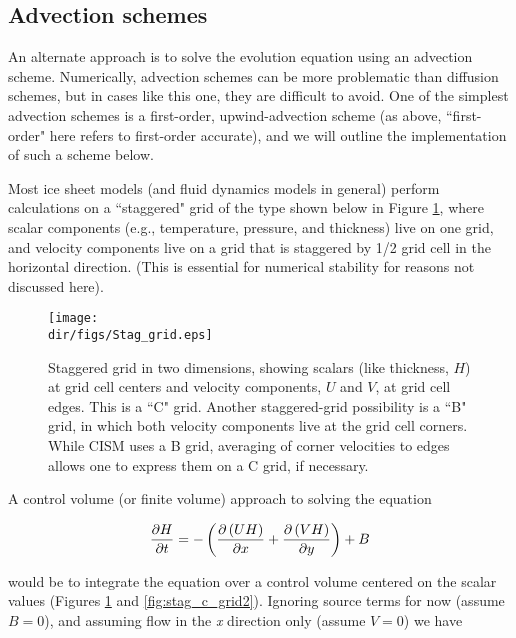 \subsection{Advection schemes}
An alternate approach is to solve the evolution equation using an advection scheme. Numerically, advection schemes can be more problematic than diffusion schemes, but in cases like this one, they are difficult to avoid. One of the simplest advection schemes is a first-order, upwind-advection scheme (as above, ``first-order" here refers to first-order accurate), and we will outline the implementation of such a scheme below.

Most ice sheet models (and fluid dynamics models in general) perform calculations on a ``staggered" grid of the type shown below in Figure \ref{fig:stag_c_grid}, where scalar components (e.g., temperature, pressure, and thickness) live on one grid, and velocity components live on 
a grid that is staggered by 1/2 grid cell in the horizontal direction. (This is essential for numerical stability for reasons not discussed here).

\begin{figure}
  \begin{center}
    \texttt{[image: \\dir/figs/Stag\_grid.eps]}
  \end{center}
\caption{Staggered grid in two dimensions, showing scalars (like thickness, $H$) at grid cell centers and velocity components, $U$ and $V$, at grid cell edges. This is a ``C" grid. Another staggered-grid possibility is a ``B" grid, in which both velocity components live at the grid cell corners. While CISM uses a B grid, averaging of corner velocities to edges allows one to express them on a C grid, if necessary.}
  \label{fig:stag_c_grid}
\end{figure} 

A control volume (or finite volume) approach to solving the equation 

\begin{equation}
\frac{\partial H}{\partial t}=-\left( \frac{\partial \left( UH \right)}{\partial x}+\frac{\partial \left( VH \right)}{\partial y} \right)+B \\ 
\end{equation}

\noindent
would be to integrate the equation over a control volume centered on the scalar values (Figures \ref{fig:stag_c_grid} and \ref{fig:stag_c_grid2}). Ignoring source terms for now (assume $B=0$), and assuming flow in the \textit{x} direction only (assume $V=0$) we have

